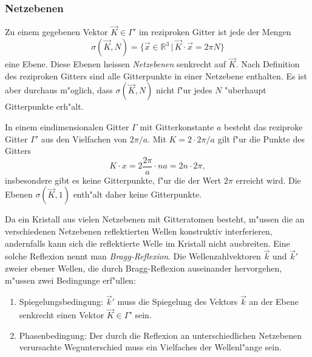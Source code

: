 \subsubsection{Netzebenen}
Zu einem gegebenen Vektor $\vec K\in \Gamma'$ im reziproken Gitter ist
jede der Mengen
\[
\sigma(\vec K,N)=\{ \vec x\in \mathbb R^3\,|\, \vec K\cdot \vec x=2\pi N\}
\]
eine Ebene.
Diese Ebenen heissen {\em Netzebenen} senkrecht auf $\vec K$.
%
Nach Definition des reziproken Gitters sind alle Gitterpunkte in
einer Netzebene enthalten. 
Es ist aber durchaus m"oglich, dass $\sigma(\vec K,N)$ nicht
f"ur jedes $N$ "uberhaupt Gitterpunkte erh"alt.

\begin{beispiel}
In einem eindimensionalen Gitter $\Gamma$ mit Gitterkonstante $a$ besteht das
reziproke Gitter $\Gamma'$ aus den Vielfachen von $2\pi/a$.
Mit $K=2\cdot 2\pi/a$ gilt f"ur die Punkte des Gitters
\[
K\cdot x=2\frac{2\pi}a\cdot na=2n\cdot 2\pi,
\]
insbesondere gibt es keine Gitterpunkte, f"ur die der Wert $2\pi$
erreicht wird.
Die Ebenen $\sigma(\vec K,1)$ enth"alt daher keine Gitterpunkte.
\end{beispiel}

Da ein Kristall aus vielen Netz\-ebenen mit Gitteratomen besteht,
m"ussen die an verschiedenen Netzebenen reflektierten Wellen konstruktiv
interferieren, andernfalls kann sich die reflektierte Welle im
Kristall nicht ausbreiten.
Eine solche Reflexion nennt man {\em Bragg-Reflexion}.
%
Die Wellenzahlvektoren $\vec k$ und $\vec k'$  zweier ebener Wellen,
die durch Bragg-Reflexion auseinander hervorgehen, m"ussen zwei
Bedingunge erf"ullen:
\begin{enumerate}
\item Spiegelungsbedingung: $\vec k'$ muss die Spiegelung des Vektors
$\vec k$ an der Ebene senkrecht einen Vektor $\vec K\in\Gamma'$ sein.
\item Phasenbedingung: Der durch die Reflexion an unterschiedlichen
Netzebenen verursachte Wegunterschied muss ein Vielfaches der Wellenl"ange
sein.
\end{enumerate}

